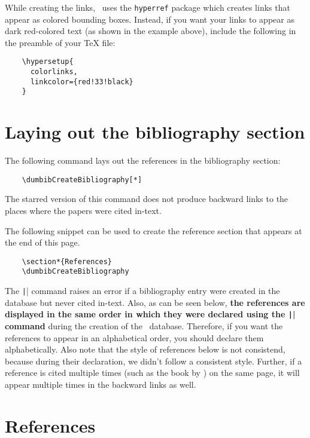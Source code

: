 \documentclass[letter, 12pt]{article}
\begin{document}
  While creating the links, \dumbib\ uses the \texttt{hyperref} package which creates links that appear as colored bounding boxes. Instead, if you want your links to appear as dark red-colored text (as shown in the example above), include the following in the preamble of your \TeX{} file:
  \begin{verbatim}
    \hypersetup{
      colorlinks,
      linkcolor={red!33!black}
    }
  \end{verbatim}

  \section{Laying out the bibliography section}
  The following command lays out the references in the bibliography section:
  \begin{verbatim}
    \dumbibCreateBibliography[*]
  \end{verbatim}
  The starred version of this command does not produce backward links to the places where the papers were cited in-text.

  The following snippet can be used to create the reference section that appears at the end of this page.

  \begin{verbatim}
    \section*{References}
    \dumbibCreateBibliography
  \end{verbatim}

  The \texttt|\dumbibCreateBibliography| command raises an error if a bibliography entry were created in the database but never cited in-text. Also, as can be seen below, \textbf{the references are displayed in the same order in which they were declared using the \texttt|\dumbibReferenceEntry{}| command} during the creation of the \dumbib\ database. Therefore, if you want the references to appear in an alphabetical order, you should declare them alphabetically. Also note that the style of references below is not consistend, because during their declaration, we didn't follow a consistent style. Further, if a reference is cited multiple times (such as the book by \cite*{talagrand2022}) on the same page, it will appear multiple times in the backward links as well.

  \section*{References}
  \dumbibCreateBibliography
\end{document}
